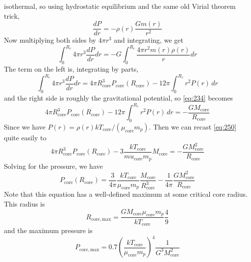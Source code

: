 \documentclass[10pt]{article}
\numberwithin{equation}{section}
\begin{document}
    isothermal, so using hydrostatic equilibrium and the same old
    Virial theorem trick,
    \begin{equation}
      \label{eq:248}
      \frac{dP}{dr}=-\rho(r)\frac{Gm(r)}{r^2}
    \end{equation}
    Now multiplying both sides by $4\pi r^3$ and integrating, we get
    \begin{equation}
      \label{eq:234}
      \int_0^{R_c}4\pi r^3\frac{dP}{dr}dr=-G\int_0^{R_c}\frac{4\pi r^2m(r)
\rho(r)}{r}dr
    \end{equation}
    The term on the left is, integrating by parts,
    \begin{equation}
      \label{eq:249}
      \int_0^{R_c}4\pi r^3\frac{dP}{dr}dr=4\pi
      R_{\mathrm{core}}^3P_{\mathrm{core}}(R_{\mathrm{core}})-12\pi\int_0^
{R_c}r^2P(r)\,dr
    \end{equation}
    and the right side is roughly the gravitational potential, so
    \eqref{eq:234} becomes
    \begin{equation}
      \label{eq:250}
      4\pi
      R_{\mathrm{core}}^3P_{\mathrm{core}}(R_{\mathrm{core}})-12\pi\int_0^
{R_c}r^2P(r)\,dr=-\frac{GM_{\mathrm{core}}}{R_{\mathrm{core}}}
    \end{equation}
    Since we have
    $P(r)=\rho(r)kT_{\mathrm{core}}/(\mu_{\mathrm{core}}m_p)$. Then we
    can recast \eqref{eq:250} quite easily to
    \begin{equation}
      \label{eq:251}
      4\pi R_{\mathrm{core}}^3P_{\mathrm{core}}(R_{\mathrm{core}})-3\frac
{kT_{\mathrm{core}}}{mu_{\mathrm{core}}m_p}M_{\mathrm{core}}=-\frac{GM_
{\mathrm{core}}^2}{R_{\mathrm{core}}}
    \end{equation}
    Solving for the pressure, we have
    \begin{equation}
      \label{eq:252}
      P_{\mathrm{core}}(R_{\mathrm{core}})=\frac{3}{4\pi}\frac{kT_{\mathrm
{core}}}{\mu_{\mathrm{core}}m_p}\frac{M_{\mathrm{core}}}{R_{\mathrm{core}}
^3}-\frac{1}{4\pi}\frac{GM_{\mathrm{core}}^2}{R_{\mathrm{core}}}
    \end{equation}
    Note that this equation has a well-defined maximum at some
    critical core radius. This radius is
    \begin{equation}
      \label{eq:253}
      R_{\mathrm{core,
          max}}=\frac{GM_{\mathrm{core}}\mu_{\mathrm{core}}m_p}{k T_
{\mathrm{core}}}\frac{4}{9}
    \end{equation}
    and the maximum pressure is
    \begin{equation}
      \label{eq:254}
      P_{\mathrm{core,max}}=0.7\left(\frac{kT_{\mathrm{core}}}{\mu_{\mathrm
{core}}m_p}\right)^4\frac{1}{G^3 M_{\mathrm{core}}^2}
    \end{equation}
\end{document}
